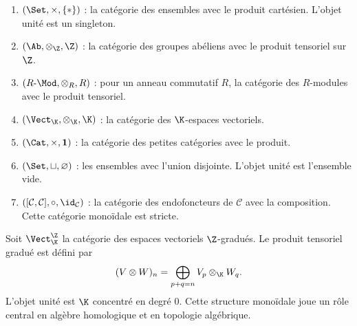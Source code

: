 \begin{exemple}\label{ex:monoidales-classiques}
\begin{enumerate}[label=(\roman*)]
\item \textbf{$(\Set, \times, \{*\})$} :
      la catégorie des ensembles avec le produit cartésien.
      L'objet unité est un singleton.

\item \textbf{$(\Ab, \otimes_\Z, \Z)$} :
      la catégorie des groupes abéliens avec le produit tensoriel
      sur $\Z$.

\item \textbf{$(R\text{-}\Mod, \otimes_R, R)$} :
      pour un anneau commutatif $R$, la catégorie des $R$-modules
      avec le produit tensoriel.

\item \textbf{$(\Vect_\K, \otimes_\K, \K)$} :
      la catégorie des $\K$-espaces vectoriels.

\item \textbf{$(\Cat, \times, \mathbf{1})$} :
      la catégorie des petites catégories avec le produit.

\item \textbf{$(\Set, \sqcup, \varnothing)$} :
      les ensembles avec l'union disjointe.  L'objet unité
      est l'ensemble vide.

\item \textbf{$([\mathcal{C}, \mathcal{C}], \circ, \id_{\mathcal{C}})$} :
      la catégorie des endofoncteurs de $\mathcal{C}$ avec la
      composition.  Cette catégorie monoïdale est stricte.
\end{enumerate}
\end{exemple}

\begin{exemple}
\label{ex:ev-gradues-monoidal}
Soit $\Vect_\K^{\Z}$ la catégorie des espaces vectoriels $\Z$-gradués.
Le produit tensoriel gradué est défini par
\[
  (V \otimes W)_n = \bigoplus_{p+q=n} V_p \otimes_\K W_q.
\]
L'objet unité est $\K$ concentré en degré $0$.
Cette structure monoïdale joue un rôle central en algèbre homologique
et en topologie algébrique.
\end{exemple}

